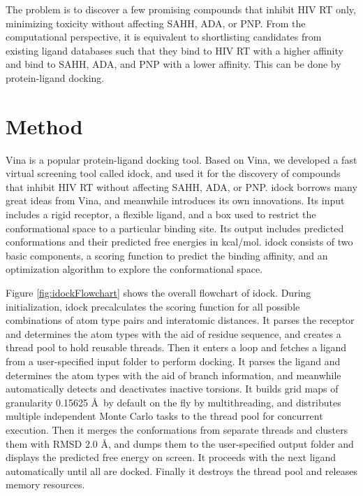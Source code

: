 \documentclass[10pt, conference, compsocconf]{IEEEtran}
\begin{document}
The problem is to discover a few promising compounds that inhibit HIV RT only, minimizing toxicity without affecting SAHH, ADA, or PNP. From the computational perspective, it is equivalent to shortlisting candidates from existing ligand databases such that they bind to HIV RT with a higher affinity and bind to SAHH, ADA, and PNP with a lower affinity. This can be done by protein-ligand docking.

\section{Method}

Vina is a popular protein-ligand docking tool. Based on Vina, we developed a fast virtual screening tool called idock, and used it for the discovery of compounds that inhibit HIV RT without affecting SAHH, ADA, or PNP. idock borrows many great ideas from Vina, and meanwhile introduces its own innovations. Its input includes a rigid receptor, a flexible ligand, and a box used to restrict the conformational space to a particular binding site. Its output includes predicted conformations and their predicted free energies in kcal/mol. idock consists of two basic components, a scoring function to predict the binding affinity, and an optimization algorithm to explore the conformational space.

Figure \ref{fig:idockFlowchart} shows the overall flowchart of idock. During initialization, idock precalculates the scoring function for all possible combinations of atom type pairs and interatomic distances. It parses the receptor and determines the atom types with the aid of residue sequence, and creates a thread pool to hold reusable threads. Then it enters a loop and fetches a ligand from a user-specified input folder to perform docking. It parses the ligand and determines the atom types with the aid of branch information, and meanwhile automatically detects and deactivates inactive torsions. It builds grid maps of granularity 0.15625 \AA\ by default on the fly by multithreading, and distributes multiple independent Monte Carlo tasks to the thread pool for concurrent execution. Then it merges the conformations from separate threads and clusters them with RMSD 2.0 \AA, and dumps them to the user-specified output folder and displays the predicted free energy on screen. It proceeds with the next ligand automatically until all are docked. Finally it destroys the thread pool and releases memory resources.
\end{document}
